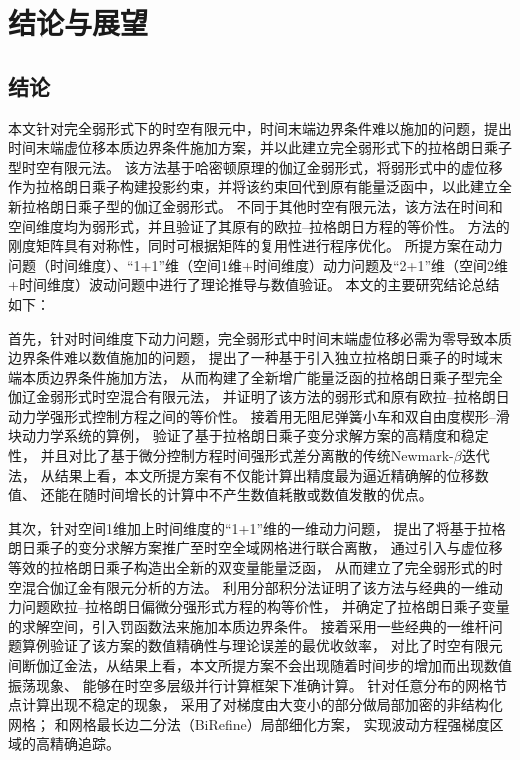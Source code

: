 \chapter{结论与展望}
\section{结论}

本文针对完全弱形式下的时空有限元中，时间末端边界条件难以施加的问题，提出时间末端虚位移本质边界条件施加方案，并以此建立完全弱形式下的拉格朗日乘子型时空有限元法。
该方法基于哈密顿原理的伽辽金弱形式，将弱形式中的虚位移作为拉格朗日乘子构建投影约束，并将该约束回代到原有能量泛函中，以此建立全新拉格朗日乘子型的伽辽金弱形式。
不同于其他时空有限元法，该方法在时间和空间维度均为弱形式，并且验证了其原有的欧拉--拉格朗日方程的等价性。
方法的刚度矩阵具有对称性，同时可根据矩阵的复用性进行程序优化。
所提方案在动力问题（时间维度）、“1+1”维（空间1维+时间维度）动力问题及“2+1”维（空间2维+时间维度）波动问题中进行了理论推导与数值验证。
本文的主要研究结论总结如下：

首先，针对时间维度下动力问题，完全弱形式中时间末端虚位移必需为零导致本质边界条件难以数值施加的问题，
提出了一种基于引入独立拉格朗日乘子的时域末端本质边界条件施加方法，
从而构建了全新增广能量泛函的拉格朗日乘子型完全伽辽金弱形式时空混合有限元法，
并证明了该方法的弱形式和原有欧拉--拉格朗日动力学强形式控制方程之间的等价性。
接着用无阻尼弹簧小车和双自由度楔形--滑块动力学系统的算例，
验证了基于拉格朗日乘子变分求解方案的高精度和稳定性，
并且对比了基于微分控制方程时间强形式差分离散的传统Newmark-$\beta$迭代法，
从结果上看，本文所提方案有不仅能计算出精度最为逼近精确解的位移数值、
还能在随时间增长的计算中不产生数值耗散或数值发散的优点。

其次，针对空间1维加上时间维度的“1+1”维的一维动力问题，
提出了将基于拉格朗日乘子的变分求解方案推广至时空全域网格进行联合离散，
通过引入与虚位移等效的拉格朗日乘子构造出全新的双变量能量泛函，
从而建立了完全弱形式的时空混合伽辽金有限元分析的方法。
利用分部积分法证明了该方法与经典的一维动力问题欧拉--拉格朗日偏微分强形式方程的构等价性，
并确定了拉格朗日乘子变量的求解空间，引入罚函数法来施加本质边界条件。
接着采用一些经典的一维杆问题算例验证了该方案的数值精确性与理论误差的最优收敛率，
对比了时空有限元间断伽辽金法，从结果上看，本文所提方案不会出现随着时间步的增加而出现数值振荡现象、
能够在时空多层级并行计算框架下准确计算。
针对任意分布的网格节点计算出现不稳定的现象，
采用了对梯度由大变小的部分做局部加密的非结构化网格；
和网格最长边二分法（BiRefine）局部细化方案，
实现波动方程强梯度区域的高精确追踪。

